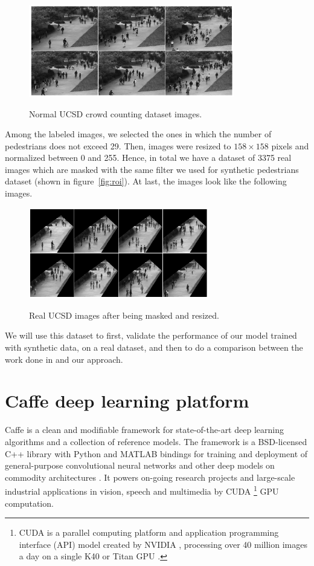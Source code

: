 \begin{figure}[H]
	\centering
	{\includegraphics[width=0.8\textwidth]{images/normalucsd}}
	\caption{Normal UCSD crowd counting dataset images.}
	\label{fig:ucsdorg}
\end{figure}

\indent Among the labeled images, we selected the ones in which the number of pedestrians does not exceed 29. Then, images were resized to  $158\times158$ pixels and normalized between 0 and 255. Hence, in total we have a dataset of 3375 real images which are masked with the same filter we used for synthetic pedestrians dataset (shown in figure~\ref{fig:roi}). At last, the images look like the following images.

\begin{figure}[H]
	\centering
	{\includegraphics[width=0.7\textwidth]{images/testucsd}}
	\caption{Real UCSD images after being masked and resized.}
	\label{fig:testucsd}
\end{figure}


\indent We will use this dataset to first, validate the performance of our model trained with synthetic data, on a real dataset, and then to do a comparison between the work done in \cite{chan2008privacy} and our approach.



\section{Caffe deep learning platform}

Caffe is a clean and modifiable framework for state-of-the-art deep learning algorithms and a collection of reference models. The framework is a BSD-licensed C++ library with Python and MATLAB bindings for training and deployment of general-purpose convolutional neural networks and other deep models on commodity architectures \cite{jia2014caffe}. It powers on-going research projects and large-scale industrial applications in vision, speech and multimedia by CUDA \footnote{CUDA is a parallel computing platform and application programming interface (API) model created by NVIDIA \cite{cuda}, processing over 40 million images a day on a single K40 or Titan GPU \cite{jia2014caffe}.}  GPU computation.

